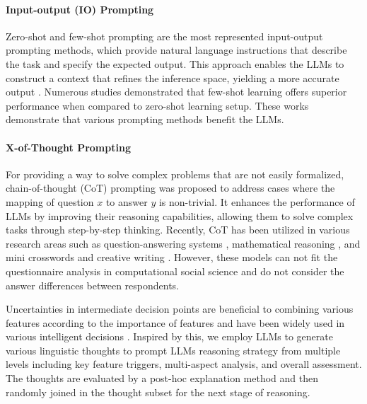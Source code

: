\paragraph{Input-output (IO) Prompting}

Zero-shot and few-shot prompting \cite{Zero_Shot_2022} are the most represented input-output prompting methods, which provide natural language instructions that describe the task and specify the expected output. This approach enables the LLMs to construct a context that refines the inference space, yielding a more accurate output \cite{Zero_Shot_Prompting_2024}. Numerous studies \cite{Few_Shot_2020,MEGA_2023} demonstrated that few-shot learning offers superior performance when compared to zero-shot learning setup. These works demonstrate that various prompting methods benefit the LLMs.

\paragraph{X-of-Thought Prompting}

For providing a way to solve complex problems that are not easily formalized, chain-of-thought (CoT) prompting \cite{Chain_of_Thought_2022} was proposed to address cases where the mapping of question $x$ to answer $y$ is non-trivial. It enhances the performance of LLMs by improving their reasoning capabilities, allowing them to solve complex tasks through step-by-step thinking. Recently, CoT has been utilized in various research areas such as question-answering systems \cite{QA_LLM_2023}, mathematical reasoning \cite{multilingual_CoT_2023}, and mini crosswords and creative writing \cite{Self_Consistency_COT_2023,Tree_of_thoughts_2023}. However, these models can not fit the questionnaire analysis in computational social science and do not consider the answer differences between respondents. 

Uncertainties in intermediate decision points are beneficial to combining various features according to the importance of features and have been widely used in various intelligent decisions \cite{TouT_2024}. Inspired by this, we employ LLMs to generate various linguistic thoughts to prompt LLMs reasoning strategy from multiple levels including key feature triggers, multi-aspect analysis, and overall assessment. The thoughts are evaluated by a post-hoc explanation method and then randomly joined in the thought subset for the next stage of reasoning.